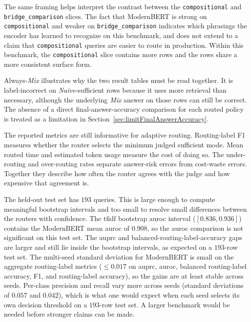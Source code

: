 \documentclass[english, bibtex]{kththesis}               %
\numberwithin{listing}{chapter}
\begin{document}
The same framing helps interpret the contrast between the \texttt{compositional} and \texttt{bridge\_comparison} slices. The fact that ModernBERT is strong on \texttt{compositional} and weaker on \texttt{bridge\_comparison} indicates which phrasings the encoder has learned to recognize on this benchmark, and does not extend to a claim that \texttt{compositional} queries are easier to route in production. Within this benchmark, the \texttt{compositional} slice contains more rows and the rows share a more consistent surface form.

Always-\emph{Mix} illustrates why the two result tables must be read together. It is label-incorrect on \emph{Naive}-sufficient rows because it uses more retrieval than necessary, although the underlying \emph{Mix} answer on those rows can still be correct. The absence of a direct final-answer-accuracy comparison for each routed policy is treated as a limitation in Section~\ref{sec:limitFinalAnswerAccuracy}.

The reported metrics are still informative for adaptive routing. Routing-label F1 measures whether the router selects the minimum judged sufficient mode. Mean routed time and estimated token usage measure the cost of doing so. The under-routing and over-routing rates separate answer-risk errors from cost-waste errors. Together they describe how often the router agrees with the judge and how expensive that agreement is.

The held-out test set has $193$ queries. This is large enough to compute meaningful bootstrap intervals and too small to resolve small differences between the routers with confidence. The \gls{tfidf} bootstrap \gls{auroc} interval ($[0.836, 0.936]$) contains the ModernBERT mean \gls{auroc} of $0.908$, so the \gls{auroc} comparison is not significant on this test set. The \gls{auprc} and balanced-routing-label-accuracy gaps are larger and still lie inside the bootstrap intervals, as expected on a $193$-row test set. The multi-seed standard deviation for ModernBERT is small on the aggregate routing-label metrics ($\leq 0.017$ on \gls{auprc}, \gls{auroc}, balanced routing-label accuracy, F1, and routing-label accuracy), so the gains are at least stable across seeds. Per-class precision and recall vary more across seeds (standard deviations of $0.057$ and $0.042$), which is what one would expect when each seed selects its own decision threshold on a $193$-row test set. A larger benchmark would be needed before stronger claims can be made.
\end{document}
